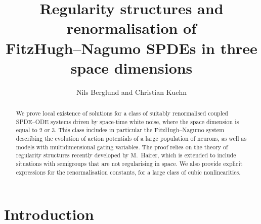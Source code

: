\documentclass[reqno,11pt]{article}
\begin{document}

\title{Regularity structures and renormalisation of\\
FitzHugh--Nagumo SPDEs in three space dimensions}
\author{Nils Berglund and Christian Kuehn}
\date{}   

\maketitle

\begin{abstract}
\noindent
We prove local existence of solutions for a class of suitably renormalised
coupled SPDE--ODE systems driven by space-time white noise, where the space
dimension is equal to $2$ or $3$. This class includes in particular the
FitzHugh--Nagumo system describing the evolution of action potentials of a large
population of neurons, as well as models with multidimensional gating variables.
The proof relies on the theory of regularity structures recently developed by
M.\ Hairer, which is extended to include situations with semigroups that are not
regularising in space. We also provide explicit expressions for the
renormalisation constants, for a large class of cubic nonlinearities.
\end{abstract}



\section{Introduction}
\label{sec_intro}
\end{document}
